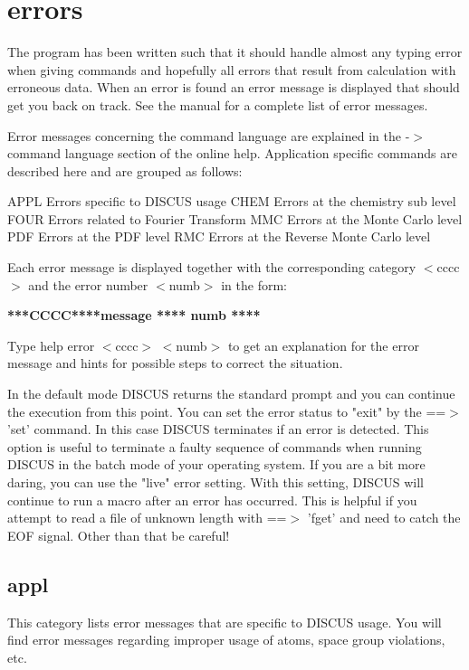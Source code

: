 \section{errors}
\par
The program has been written such that it should handle almost 
any typing error when giving commands and hopefully all errors 
that result from calculation with erroneous data. When an error 
is found an error message is displayed that should get you back 
on track. See the manual for a complete list of error messages. 
\par
Error messages concerning the command language are explained in 
the -$> $ command language section of the online help. Application 
specific commands are described here and are grouped as follows: 
\par
\begin{MacVerbatim}
APPL   Errors specific to DISCUS usage
CHEM   Errors at the chemistry sub level
FOUR   Errors related to Fourier Transform
MMC    Errors at the Monte Carlo level
PDF    Errors at the PDF level
RMC    Errors at the Reverse Monte Carlo level
\end{MacVerbatim}
Each error message is displayed together with the corresponding 
category $ <$cccc$> $ and the error number $ <$numb$> $ in the form: 
\par
{\bf ****CCCC****message                    **** numb **** \par }
\par
\vspace{3pt}
Type 
help error $ <$cccc$> $ $ <$numb$> $ 
to get an explanation for the error message and hints for possible 
steps to correct the situation. 
\par
In the default mode DISCUS returns the standard prompt and you can 
continue the execution from this point. You can set the error status 
to "exit" by the ==$> $'set' command. In this case DISCUS terminates 
if an error is detected. This option is useful to terminate a faulty 
sequence of commands when running DISCUS in the batch mode of your 
operating system. 
If you are a bit more daring, you can use the "live" error setting. 
With this setting, DISCUS will continue to run a macro after an 
error has occurred. This is helpful if you attempt to read a file 
of unknown length with ==$> $ 'fget' and need to catch the EOF signal. 
Other than that be careful! 
\par
\subsection*{appl}
\par
This category lists error messages that are specific to DISCUS usage. 
You will find error messages regarding improper usage of atoms, 
space group violations, etc. 
\par
